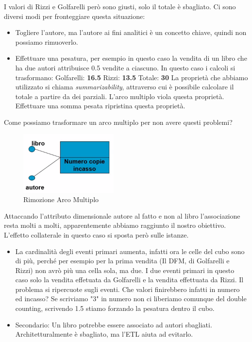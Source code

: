 I valori di Rizzi e Golfarelli però sono giusti, solo il totale è sbagliato.
Ci sono diversi modi per fronteggiare questa situazione:
\begin{itemize}
	\item Togliere l'autore, ma l'autore ai fini analitici è un concetto chiave, quindi non possiamo rimuoverlo.
	\item Effettuare una pesatura, per esempio in questo caso la vendita di un libro che ha due autori attribuisce 0.5 vendite a ciascuno. In questo caso i calcoli si trasformano:\newline\newline
	Golfarelli: \textbf{16.5}\newline
	Rizzi: \textbf{13.5}\newline
	Totale: \textbf{30}\newline\newline
	La proprietà che abbiamo utilizzato si chiama \textit{summarizability}, attraverso cui è possibile calcolare il totale a partire da dei parziali. L'arco multiplo viola questa proprietà. Effettuare una somma pesata ripristina questa proprietà.
\end{itemize}
\noindent Come possiamo trasformare un arco multiplo per non avere questi problemi?
\begin{figure}[H]
	\begin{center}
		\includegraphics[width=0.4\linewidth]{img/removemult.PNG}
		\caption{Rimozione Arco Multiplo}
	\end{center}
\end{figure}
\noindent Attaccando l'attributo dimensionale autore al fatto e non al libro l'associazione resta molti a molti, apparentemente abbiamo raggiunto il nostro obiettivo. L'effetto collaterale in questo caso si sposta però sulle istanze.
\begin{itemize}
	\item La cardinalità degli eventi primari aumenta, infatti ora le celle del cubo sono di più, perché per esempio per la prima vendita (Il DFM, di Golfarelli e Rizzi) non avrò più una cella sola, ma due. I due eventi primari in questo caso solo la vendita effetuata da Golfarelli e la vendita effettuata da Rizzi. Il problema si ripercuote sugli eventi.\newline
	Che valori finirebbero infatti in numero ed incasso? Se scriviamo "3" in numero non ci liberiamo comunque del double counting, scrivendo 1.5 stiamo forzando la pesatura dentro il cubo.\newline
	\item Secondario: Un libro potrebbe essere associato ad autori sbagliati. Architetturalmente è sbagliato, ma l'ETL aiuta ad evitarlo.
\end{itemize}
